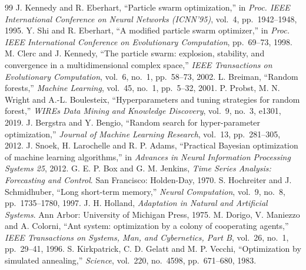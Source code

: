 \renewcommand{\bibname}{References}
\begingroup
\renewcommand{\chapter}[2]{\section*{#2}\addcontentsline{toc}{section}{References}}
\begin{thebibliography}{99}
\setlength{\itemsep}{2pt}
 J. Kennedy and R. Eberhart, ``Particle swarm optimization,'' in \emph{Proc. IEEE International Conference on Neural Networks (ICNN'95)}, vol.~4, pp.~1942--1948, 1995.
 Y. Shi and R. Eberhart, ``A modified particle swarm optimizer,'' in \emph{Proc. IEEE International Conference on Evolutionary Computation}, pp.~69--73, 1998.
 M. Clerc and J. Kennedy, ``The particle swarm: explosion, stability, and convergence in a multidimensional complex space,'' \emph{IEEE Transactions on Evolutionary Computation}, vol.~6, no.~1, pp.~58--73, 2002.
 L. Breiman, ``Random forests,'' \emph{Machine Learning}, vol.~45, no.~1, pp.~5--32, 2001.
 P. Probst, M. N. Wright and A.-L. Boulesteix, ``Hyperparameters and tuning strategies for random forest,'' \emph{WIREs Data Mining and Knowledge Discovery}, vol.~9, no.~3, e1301, 2019.
 J. Bergstra and Y. Bengio, ``Random search for hyper-parameter optimization,'' \emph{Journal of Machine Learning Research}, vol.~13, pp.~281--305, 2012.
 J. Snoek, H. Larochelle and R. P. Adams, ``Practical Bayesian optimization of machine learning algorithms,'' in \emph{Advances in Neural Information Processing Systems 25}, 2012.
 G. E. P. Box and G. M. Jenkins, \emph{Time Series Analysis: Forecasting and Control}. San Francisco: Holden-Day, 1970.
 S. Hochreiter and J. Schmidhuber, ``Long short-term memory,'' \emph{Neural Computation}, vol.~9, no.~8, pp.~1735--1780, 1997.
 J. H. Holland, \emph{Adaptation in Natural and Artificial Systems}. Ann Arbor: University of Michigan Press, 1975.
 M. Dorigo, V. Maniezzo and A. Colorni, ``Ant system: optimization by a colony of cooperating agents,'' \emph{IEEE Transactions on Systems, Man, and Cybernetics, Part B}, vol.~26, no.~1, pp.~29--41, 1996.
 S. Kirkpatrick, C. D. Gelatt and M. P. Vecchi, ``Optimization by simulated annealing,'' \emph{Science}, vol.~220, no.~4598, pp.~671--680, 1983.

\end{thebibliography}
